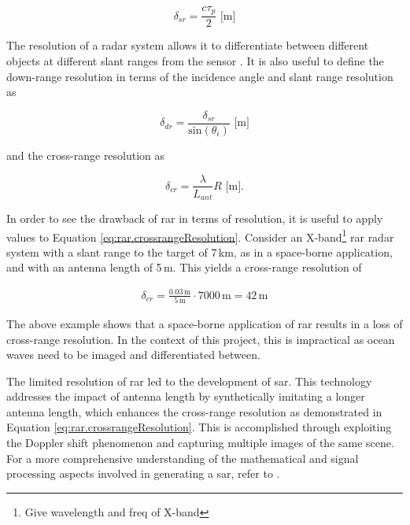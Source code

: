 \begin{equation} \label{eq:rar.slantRangeResolution}
    \delta_{sr} = \frac{c \tau_{p}}{2} \,\, \text{[m]}
\end{equation}

The resolution of a radar system allows it to differentiate between different objects at different slant ranges from the sensor \cite{Moreira2013}. It is also useful to define the down-range resolution in terms of the incidence angle and slant range resolution as

\begin{equation} \label{eq:rar.groundRangeResolution}
    \delta_{dr} = \frac{\delta_{sr}}{\text{sin}(\theta_{i})} \,\, \text{[m]}
\end{equation}

and the cross-range resolution as

\begin{equation} \label{eq:rar.crossrangeResolution}
  \delta_{cr} = \frac{\lambda}{L_{ant}}R \,\, \text{[m].}
\end{equation}

In order to see the drawback of \ac{rar} in terms of resolution, it is useful to apply values to Equation \ref{eq:rar.crossrangeResolution}. Consider an X-band\footnote{Give wavelength and freq of X-band} \ac{rar} radar system with a slant range to the target of 7\,km, as in a space-borne application, and with an antenna length of 5\,m. This yields a cross-range resolution of

\begin{gather*}
    \delta_{cr} = \frac{0.03\,\text{m}}{5\,\text{m}} \cdot 7000\,\text{m} = 42\,\text{m}
\end{gather*}

The above example shows that a space-borne application of \acs{rar} results in a loss of cross-range resolution. In the context of this project, this is impractical as ocean waves need to be imaged and differentiated between.

The limited resolution of \acs{rar} led to the development of \acs{sar}. This technology addresses the impact of antenna length by synthetically imitating a longer antenna length, which enhances the cross-range resolution as demonstrated in Equation \ref{eq:rar.crossrangeResolution}. This is accomplished through exploiting the Doppler shift phenomenon and capturing multiple images of the same scene. For a more comprehensive understanding of the mathematical and signal processing aspects involved in generating a \acs{sar}, refer to \cite{Cumming2005}.


